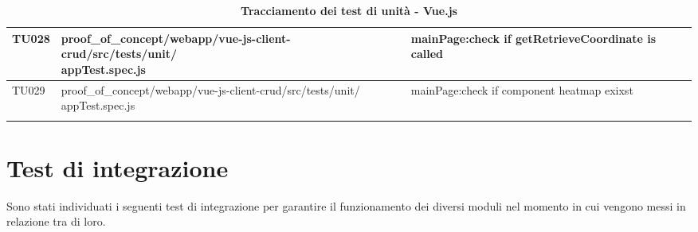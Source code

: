 \begin{center}
\begin{longtable}{|p{1.5cm}|p{11.5cm}|p{3.5cm}|}
		\hline
		\centering TU028 & \makecell[c]{proof{\_}of{\_}concept/webapp/vue-js-client-crud/src/tests/unit/\\appTest.spec.js} & {mainPage:check if getRetrieveCoordinate is called}\\
		\hline
		\centering TU029 & \makecell[c]{proof{\_}of{\_}concept/webapp/vue-js-client-crud/src/tests/unit/\\appTest.spec.js} & mainPage:check if component heatmap exixst\\
		\hline
		\rowcolor{white}
		\caption{\textbf{Tracciamento dei test di unità - Vue.js}}
	\end{longtable}	
\end{center}

\section{Test di integrazione}\label{SpecificaDeiTestTestDiIntegrazione}
Sono stati individuati i seguenti test di integrazione per garantire il funzionamento dei diversi moduli nel momento in cui vengono messi in relazione tra di loro.
\def\tabularxcolumn#1{m{#1}}
